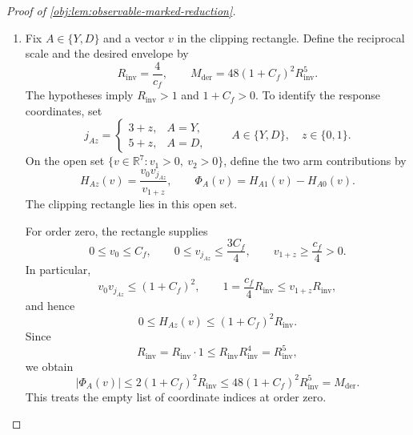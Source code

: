\documentclass[11pt]{article}
\begin{document}
\begin{proof}[Proof of \cref{obj:lem:observable-marked-reduction}]
\begin{enumerate}
\item Fix \(A\in\{Y,D\}\) and a vector \(v\) in the clipping rectangle. Define the reciprocal scale and the desired envelope by
\[
R_{\mathrm{inv}}=\frac4{c_f},
\qquad
M_{\mathrm{der}}=48(1+C_f)^2R_{\mathrm{inv}}^5.
\]
The hypotheses imply \(R_{\mathrm{inv}}>1\) and \(1+C_f>0\). To identify the response coordinates, set
\[
j_{Az}=
\begin{cases}
3+z,&A=Y,\\
5+z,&A=D,
\end{cases}
\qquad A\in\{Y,D\},\quad z\in\{0,1\}.
\]
On the open set \(\{v\in\mathbb R^7:v_1>0,\ v_2>0\}\), define the two arm contributions by
\[
H_{Az}(v)=\frac{v_0v_{j_{Az}}}{v_{1+z}},
\qquad
\Phi_A(v)=H_{A1}(v)-H_{A0}(v).
\]
The clipping rectangle lies in this open set.

For order zero, the rectangle supplies
\[
0\le v_0\le C_f,\qquad
0\le v_{j_{Az}}\le\frac{3C_f}{4},\qquad
v_{1+z}\ge\frac{c_f}{4}>0.
\]
In particular,
\[
v_0v_{j_{Az}}\le(1+C_f)^2,
\qquad
1=\frac{c_f}{4}R_{\mathrm{inv}}
\le v_{1+z}R_{\mathrm{inv}},
\]
and hence
\[
0\le H_{Az}(v)\le(1+C_f)^2R_{\mathrm{inv}}.
\]
Since
\[
R_{\mathrm{inv}}
=R_{\mathrm{inv}}\cdot1
\le R_{\mathrm{inv}}R_{\mathrm{inv}}^4
=R_{\mathrm{inv}}^5,
\]
we obtain
\[
|\Phi_A(v)|
\le 2(1+C_f)^2R_{\mathrm{inv}}
\le48(1+C_f)^2R_{\mathrm{inv}}^5
=M_{\mathrm{der}}.
\]
This treats the empty list of coordinate indices at order zero.


\end{enumerate}
\end{proof}
\end{document}
